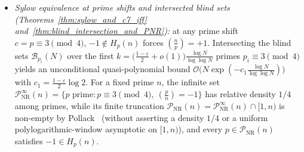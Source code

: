 \documentclass[11pt, a4paper]{article}
\theoremstyle{plain}
\theoremstyle{definition}
\newcommand{\leg}[2]{\left(\frac{#1}{#2}\right)}
\begin{document}
\begin{itemize}
    \item \emph{Sylow equivalence at prime shifts and intersected blind sets (Theorems~\ref{thm:sylow_and_c7_iff} and~\ref{thm:blind_intersection_and_PNR}):} at any prime shift $c=p\equiv3\pmod 4$, $-1\notin H_p(n)$ forces $\leg{n}{p}=+1$. Intersecting the blind sets $\mathcal{B}_{p_i}(N)$ over the first $k=\big(\frac{1-\varepsilon}{2}+o(1)\big)\frac{\log N}{\log\log N}$ primes $p_i\equiv3\pmod 4$ yields an unconditional quasi-polynomial bound $\mathcal{O}\big(N\exp(-c_1\frac{\log N}{\log\log N})\big)$ with $c_1=\frac{1-\varepsilon}{2}\log 2$. For a fixed prime $n$, the infinite set $\mathcal{P}_{\mathrm{NR}}^{\infty}(n)=\{p\text{ prime}:p\equiv3\pmod 4,\ \leg{p}{n}=-1\}$ has relative density $1/4$ among primes, while its finite truncation $\mathcal{P}_{\mathrm{NR}}(n)=\mathcal{P}_{\mathrm{NR}}^{\infty}(n)\cap[1,n)$ is non-empty by Pollack~\cite{PollackPrescribed4} (without asserting a density $1/4$ or a uniform polylogarithmic-window asymptotic on $[1,n)$), and every $p\in\mathcal{P}_{\mathrm{NR}}(n)$ satisfies $-1\in H_p(n)$.
\end{itemize}
\end{document}
